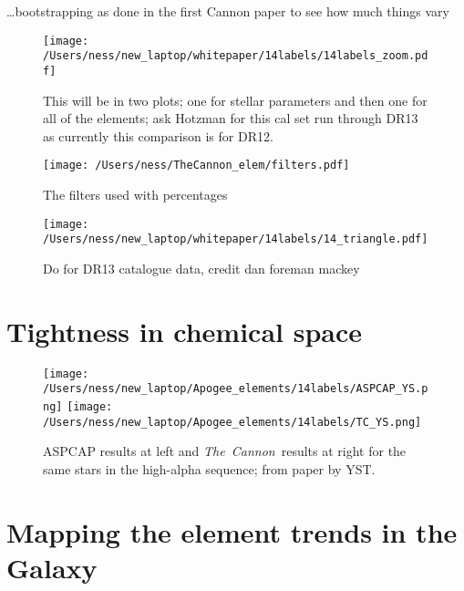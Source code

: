 \documentclass[12pt, preprint]{aastex}
\newcommand{\project}[1]{\textsl{#1}}
\newcommand{\tc}{\project{The~Cannon}}
\begin{document}
\ldots bootstrapping as done in the first Cannon paper to see how much things vary



\begin{figure}
\flushleft
  \texttt{[image: /Users/ness/new\_laptop/whitepaper/14labels/14labels\_zoom.pdf]}
    \caption{ This will be in two plots; one for stellar parameters and then one for all of the elements; ask Hotzman for this cal set run through DR13 as currently this comparison is for DR12. }
\label{fig:cn}
\end{figure}


\begin{figure}
\centering
  \texttt{[image: /Users/ness/TheCannon\_elem/filters.pdf]}
    \caption{The filters used with percentages }
\label{fig:cn}
\end{figure}



\begin{figure}
\flushleft
  \texttt{[image: /Users/ness/new\_laptop/whitepaper/14labels/14\_triangle.pdf]}
    \caption{Do for DR13 catalogue data, credit dan foreman mackey }
\label{fig:cn}
\end{figure}

\section{Tightness in chemical space}

\begin{figure}
\flushleft
  \texttt{[image: /Users/ness/new\_laptop/Apogee\_elements/14labels/ASPCAP\_YS.png]}
    \texttt{[image: /Users/ness/new\_laptop/Apogee\_elements/14labels/TC\_YS.png]}
    \caption{ASPCAP results at left and \tc\   results at right for the same stars in the high-alpha sequence; from paper by YST.}
\label{fig:cn}
\end{figure}

\section{Mapping the element trends in the Galaxy}
\end{document}
